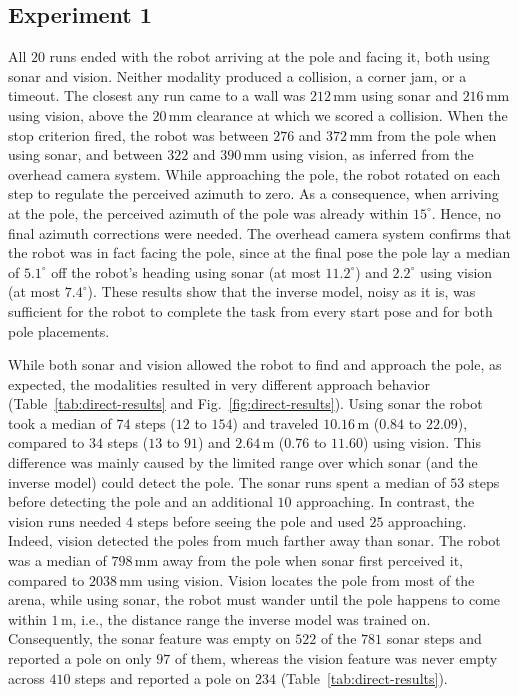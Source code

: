 \documentclass[11pt]{article}
\begin{document}
\subsection{Experiment 1}


All $20$ runs ended with the robot arriving at the pole and facing it, both using sonar and vision. Neither modality produced a collision, a corner jam, or a timeout. The closest any run came to a wall was $212$\,mm using sonar and $216$\,mm using vision, above the $20$\,mm clearance at which we scored a collision. When the stop criterion fired, the robot was between $276$ and $372$\,mm from the pole when using sonar, and between $322$ and $390$\,mm using vision, as inferred from the overhead camera system. While approaching the pole, the robot rotated on each step to regulate the perceived azimuth to zero. As a consequence, when arriving at the pole, the perceived azimuth of the pole was already within $15^{\circ}$. Hence, no final azimuth corrections were needed. The overhead camera system confirms that the robot was in fact facing the pole, since at the final pose the pole lay a median of $5.1^{\circ}$ off the robot's heading using sonar (at most $11.2^{\circ}$) and $2.2^{\circ}$ using vision (at most $7.4^{\circ}$). These results show that the inverse model, noisy as it is, was sufficient for the robot to complete the task from every start pose and for both pole placements.


While both sonar and vision allowed the robot to find and approach the pole, as expected, the modalities resulted in very different approach behavior (Table~\ref{tab:direct-results} and Fig.~\ref{fig:direct-results}). Using sonar the robot took a median of $74$ steps ($12$ to $154$) and traveled $10.16$\,m ($0.84$ to $22.09$), compared to $34$ steps ($13$ to $91$) and $2.64$\,m ($0.76$ to $11.60$) using vision. This difference was mainly caused by the limited range over which sonar (and the inverse model) could detect the pole. The sonar runs spent a median of $53$ steps before detecting the pole and an additional $10$ approaching. In contrast,  the vision runs needed $4$ steps before seeing the pole and used $25$ approaching. Indeed, vision detected the poles from much farther away than sonar. The robot was a median of $798$\,mm away from the pole when sonar first perceived it, compared to $2038$\,mm using vision. Vision locates the pole from most of the arena, while using sonar, the robot must wander until the pole happens to come within $1$\,m, i.e., the distance range the inverse model was trained on. Consequently, the sonar feature was empty on $522$ of the $781$ sonar steps and reported a pole on only $97$ of them, whereas the vision feature was never empty across $410$ steps and reported a pole on $234$ (Table~\ref{tab:direct-results}).
\end{document}
